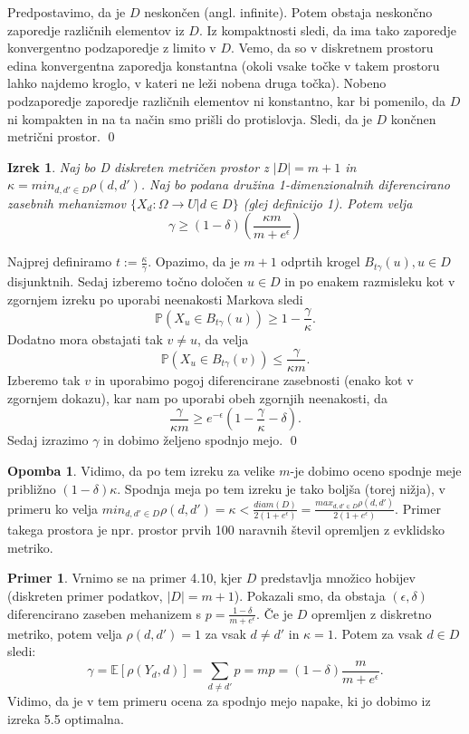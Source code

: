 \documentclass[12pt,a4paper]{amsart}
\theoremstyle{definition} %
\newtheorem{primer}[definicija]{Primer}
\newtheorem{opomba}[definicija]{Opomba}
\theoremstyle{plain} %
\newtheorem{izrek}[definicija]{Izrek}
\begin{document}
\proof
 Predpostavimo, da je $D$ neskončen (angl. infinite). Potem obstaja neskončno zaporedje različnih elementov iz $D$. Iz kompaktnosti sledi, da ima tako zaporedje konvergentno podzaporedje z limito v $D$. Vemo, da so v diskretnem prostoru edina konvergentna zaporedja konstantna (okoli vsake točke v takem prostoru lahko najdemo kroglo, v kateri ne leži nobena druga točka). Nobeno podzaporedje zaporedje različnih elementov ni konstantno, kar bi pomenilo, da $D$ ni kompakten in na ta način smo prišli do protislovja. Sledi, da je $D$ končnen metrični prostor.
\qed
\newline
\newline
\begin{izrek}
Naj bo D diskreten metričen prostor z $|D| = m + 1$ in $\kappa = min_{d,d' \in D}\rho(d,d')$.  Naj bo podana družina 1-dimenzionalnih diferencirano zasebnih mehanizmov $\{ X_d: \Omega \rightarrow U | d \in D\}$ (glej definicijo 1). Potem velja $$\gamma  \geq (1-\delta)(\frac{\kappa m}{m+e^\epsilon})$$
\end{izrek}
\proof
Najprej definiramo $t := \frac{\kappa}{\gamma}$. Opazimo, da je $m + 1$ odprtih krogel $B_{t\gamma}(u), u \in D$ disjunktnih. Sedaj izberemo točno določen $u \in D$ in po enakem razmisleku kot v zgornjem izreku po uporabi neenakosti Markova sledi $$\mathbb{P}(X_u \in B_{t\gamma}(u)) \geq 1 - \frac{\gamma}{\kappa}.$$
Dodatno mora obstajati tak $v \neq u$, da velja $$\mathbb{P}(X_u \in B_{t\gamma}(v)) \leq \frac{\gamma}{\kappa m}.$$  Izberemo tak $v$ in uporabimo pogoj diferencirane zasebnosti (enako kot v zgornjem dokazu), kar nam po uporabi obeh zgornjih neenakosti, da $$\frac{\gamma}{\kappa m} \geq e^{-\epsilon}(1 - \frac{\gamma}{\kappa} - \delta). $$ Sedaj izrazimo $\gamma$ in dobimo željeno spodnjo mejo.
\qed
\begin{opomba}
Vidimo, da po tem izreku za velike $m$-je dobimo oceno spodnje meje približno $(1-\delta)\kappa$. Spodnja meja po tem izreku je tako boljša (torej nižja), v primeru ko velja $min_{d,d' \in D}\rho(d,d') = \kappa < \frac{diam(D)}{2(1+e^\epsilon)} =  \frac{max_{d,d' \in D}\rho(d,d')}{2(1+e^\epsilon)}$. Primer takega prostora je npr. prostor prvih 100 naravnih števil opremljen z evklidsko metriko.
\end{opomba}
\begin{primer}
Vrnimo se na primer 4.10, kjer $D$ predstavlja množico hobijev (diskreten primer podatkov, $|D|=m+1$). Pokazali smo, da obstaja $(\epsilon, \delta)$ diferencirano zaseben mehanizem s $p=\frac{1-\delta}{m+e^{\epsilon}}$. Če je $D$ opremljen z diskretno metriko, potem velja $\rho(d,d')=1$ za vsak $d \neq d'$ in $\kappa=1$. Potem za vsak $d \in D$ sledi:
$$\gamma = \mathbb{E}[\rho(Y_d,d)] = \sum_{d \neq d'}p=mp=(1-\delta)\frac{m}{m+e^{\epsilon}}.$$ Vidimo, da je v tem primeru ocena za spodnjo mejo napake, ki jo dobimo iz izreka 5.5 optimalna.
\end{primer}
\end{document}
